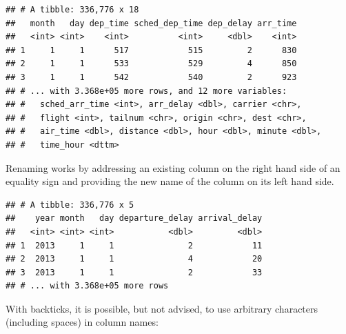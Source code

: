 \documentclass[]{book}
\newenvironment{Shaded}{}{}
\newcommand{\DataTypeTok}[1]{#1}
\newcommand{\DecValTok}[1]{#1}
\newcommand{\KeywordTok}[1]{\textcolor[rgb]{0.00,0.00,1.00}{#1}}
\newcommand{\NormalTok}[1]{#1}
\newcommand{\OperatorTok}[1]{#1}
\newcommand{\StringTok}[1]{\textcolor[rgb]{0.00,0.50,0.50}{#1}}
\begin{document}
\begin{verbatim}
## # A tibble: 336,776 x 18
##   month   day dep_time sched_dep_time dep_delay arr_time
##   <int> <int>    <int>          <int>     <dbl>    <int>
## 1     1     1      517            515         2      830
## 2     1     1      533            529         4      850
## 3     1     1      542            540         2      923
## # ... with 3.368e+05 more rows, and 12 more variables:
## #   sched_arr_time <int>, arr_delay <dbl>, carrier <chr>,
## #   flight <int>, tailnum <chr>, origin <chr>, dest <chr>,
## #   air_time <dbl>, distance <dbl>, hour <dbl>, minute <dbl>,
## #   time_hour <dttm>
\end{verbatim}

Renaming works by addressing an existing column on the right hand side of an equality sign and providing the new name of the column on its left hand side.

\begin{Shaded}
\end{Shaded}

\begin{verbatim}
## # A tibble: 336,776 x 5
##    year month   day departure_delay arrival_delay
##   <int> <int> <int>           <dbl>         <dbl>
## 1  2013     1     1               2            11
## 2  2013     1     1               4            20
## 3  2013     1     1               2            33
## # ... with 3.368e+05 more rows
\end{verbatim}

With backticks, it is possible, but not advised, to use arbitrary characters (including spaces) in column names:

\begin{Shaded}
\end{Shaded}
\end{document}
